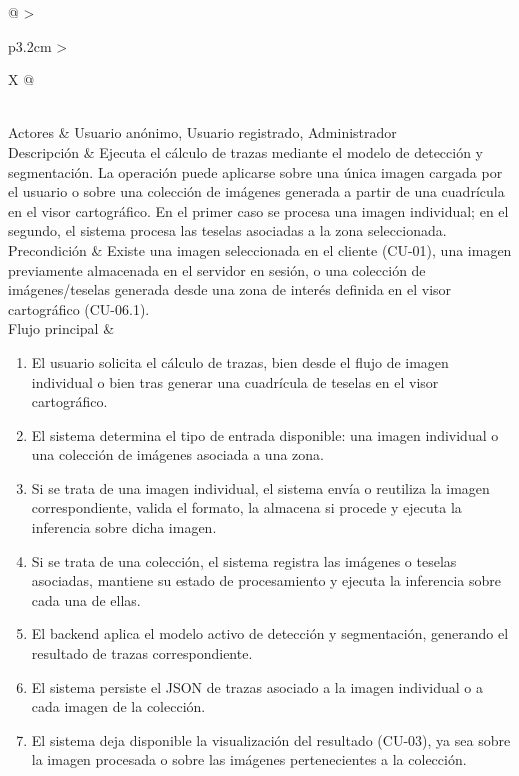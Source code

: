 \begin{table}[]
	\label{tab:cu02}
	\centering
	\footnotesize
	\renewcommand{\arraystretch}{1.3}
	\setlength{\tabcolsep}{4pt}
	\begin{tabularx}{\textwidth}{@{}
			>{\raggedright\arraybackslash}p{3.2cm}
			>{\raggedright\arraybackslash}X
			@{}}
		\toprule
		 \\
		\midrule
		Actores &
		Usuario anónimo, Usuario registrado, Administrador \\
		
		Descripción &
		Ejecuta el cálculo de trazas mediante el modelo de detección y segmentación. La operación puede aplicarse sobre una única imagen cargada por el usuario o sobre una colección de imágenes generada a partir de una cuadrícula en el visor cartográfico. En el primer caso se procesa una imagen individual; en el segundo, el sistema procesa las teselas asociadas a la zona seleccionada. \\
		
		Precondición &
		Existe una imagen seleccionada en el cliente (CU-01), una imagen previamente almacenada en el servidor en sesión, o una colección de imágenes/teselas generada desde una zona de interés definida en el visor cartográfico (CU-06.1). \\
		
		Flujo principal &
		\begin{minipage}[t]{\linewidth}
			\vspace{-\baselineskip}
			\begin{enumerate}
				\renewcommand{\labelenumi}{\arabic{enumi})}
				\setlength{\itemsep}{0pt}
				\setlength{\parskip}{0pt}
				\setlength{\parsep}{0pt}
				\item El usuario solicita el cálculo de trazas, bien desde el flujo de imagen individual o bien tras generar una cuadrícula de teselas en el visor cartográfico.
				\item El sistema determina el tipo de entrada disponible: una imagen individual o una colección de imágenes asociada a una zona.
				\item Si se trata de una imagen individual, el sistema envía o reutiliza la imagen correspondiente, valida el formato, la almacena si procede y ejecuta la inferencia sobre dicha imagen.
				\item Si se trata de una colección, el sistema registra las imágenes o teselas asociadas, mantiene su estado de procesamiento y ejecuta la inferencia sobre cada una de ellas.
				\item El backend aplica el modelo activo de detección y segmentación, generando el resultado de trazas correspondiente.
				\item El sistema persiste el JSON de trazas asociado a la imagen individual o a cada imagen de la colección.
				\item El sistema deja disponible la visualización del resultado (CU-03), ya sea sobre la imagen procesada o sobre las imágenes pertenecientes a la colección.
			\end{enumerate}
		\end{minipage} \\
		

\end{tabularx}
\end{table}

